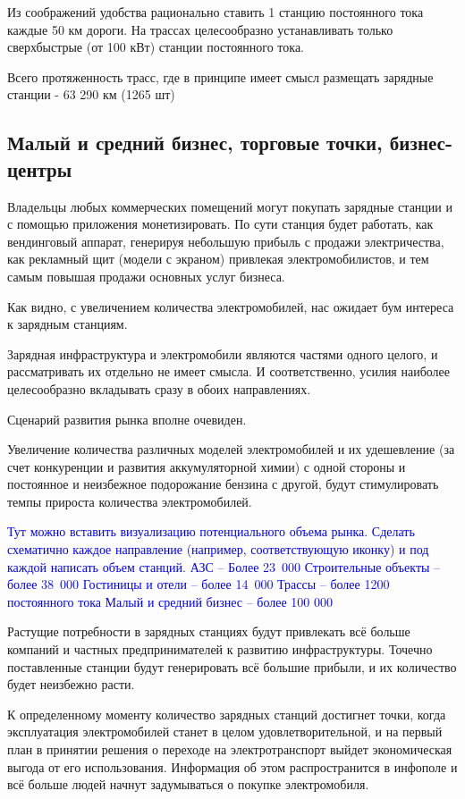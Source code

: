 \documentclass[a4paper,12pt]{report}
\begin{document}
Из соображений удобства рационально ставить 1 станцию постоянного тока каждые 50 км дороги. На трассах целесообразно устанавливать только сверхбыстрые (от 100 кВт) станции постоянного тока. 

Всего протяженность трасс, где в принципе имеет смысл размещать зарядные станции  - 63 290 км (1265 шт)

\subsection{Малый и средний бизнес, торговые точки, бизнес-центры}

Владельцы любых коммерческих помещений могут покупать зарядные станции и с помощью приложения монетизировать. По сути станция будет работать, как вендинговый аппарат, генерируя небольшую прибыль с продажи электричества, как рекламный щит (модели с экраном) привлекая электромобилистов, и тем самым повышая продажи основных услуг бизнеса. 

Как видно, с увеличением количества электромобилей, нас ожидает бум интереса к зарядным станциям. 

Зарядная инфраструктура и электромобили являются частями одного целого, и рассматривать их отдельно не имеет смысла. И соответственно, усилия наиболее целесообразно вкладывать сразу в обоих направлениях.  

Сценарий развития рынка вполне очевиден. 

Увеличение количества различных моделей электромобилей и их удешевление (за счет конкуренции и развития аккумуляторной химии) с одной стороны и постоянное и неизбежное подорожание бензина с другой, будут стимулировать темпы прироста количества электромобилей. 

\textcolor{blue}{Тут можно вставить визуализацию потенциального объема рынка. Сделать схематично каждое направление (например, соответствующую иконку) и под каждой написать объем станций.	
	АЗС – Более 23 000
	Строительные объекты – более 38 000
	Гостиницы и отели – более 14 000
	Трассы – более 1200 постоянного тока
	Малый и средний бизнес – более 100 000}

Растущие потребности в зарядных станциях будут привлекать всё больше компаний и частных предпринимателей к развитию инфраструктуры. Точечно поставленные станции будут генерировать всё большие прибыли, и их количество будет неизбежно расти. 

К определенному моменту количество зарядных станций достигнет точки, когда эксплуатация электромобилей станет в целом удовлетворительной, и на первый план в принятии решения о переходе на электротранспорт выйдет экономическая выгода от его использования. Информация об этом распространится в инфополе и всё больше людей начнут задумываться о покупке электромобиля.
\end{document}
